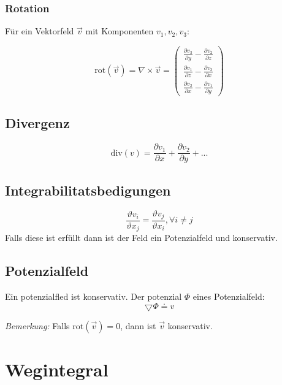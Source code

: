 \documentclass[11pt]{article}
\begin{document}
\subsubsection{Rotation}

Für ein Vektorfeld $\vec{v}$ mit Komponenten $v_1,v_2,v_3$:

\begin{equation*}
	\text{rot}(\vec{v})=\nabla\times \vec{v} =
	\begin{pmatrix}
		\frac{\partial v_3}{\partial y} - \frac{\partial v_2}{\partial z}\\
		\frac{\partial v_1}{\partial z} - \frac{\partial v_3}{\partial x}\\
		\frac{\partial v_2}{\partial x} - \frac{\partial v_1}{\partial y}
	\end{pmatrix}
\end{equation*}

\subsection{Divergenz}
\begin{equation*}
	\text{div}(v)= \frac{\partial v_1}{\partial x} + \frac{\partial v_2}{\partial y} + ... 
\end{equation*}

\subsection{Integrabilitatsbedigungen}
\begin{equation*}
	\frac{\vartheta v_i}{\vartheta x_j}=\frac{\vartheta v_j}{\vartheta x_i},\forall i \neq j
\end{equation*}
Falls diese ist erfüllt dann ist der Feld ein Potenzialfeld und konservativ.

\subsection{Potenzialfeld}
Ein potenzialfled ist konservativ. Der potenzial $\Phi$ eines Potenzialfeld:
\begin{equation*}
	\bigtriangledown \Phi \doteq v
\end{equation*}

\emph{Bemerkung:} Falls $\text{rot}(\vec{v})=0$, dann ist $\vec{v}$ konservativ.

\section{Wegintegral}
\end{document}
